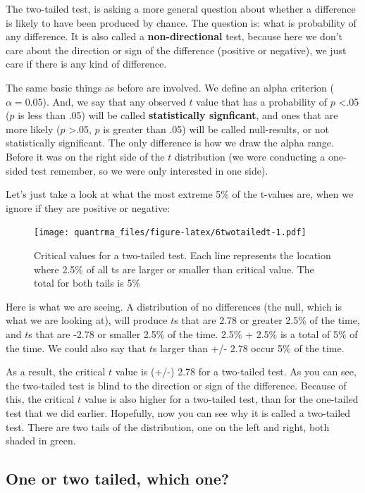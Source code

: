 \documentclass[
]{book}
\begin{document}
The two-tailed test, is asking a more general question about whether a difference is likely to have been produced by chance. The question is: what is probability of any difference. It is also called a \textbf{non-directional} test, because here we don't care about the direction or sign of the difference (positive or negative), we just care if there is any kind of difference.

The same basic things as before are involved. We define an alpha criterion (\(\alpha = 0.05\)). And, we say that any observed \(t\) value that has a probability of \(p\) \textless.05 (\(p\) is less than .05) will be called \textbf{statistically signficant}, and ones that are more likely (\(p\) \textgreater.05, \(p\) is greater than .05) will be called null-results, or not statistically significant. The only difference is how we draw the alpha range. Before it was on the right side of the \(t\) distribution (we were conducting a one-sided test remember, so we were only interested in one side).

Let's just take a look at what the most extreme 5\% of the t-values are, when we ignore if they are positive or negative:

\begin{figure}
\centering
\texttt{[image: quantrma\_files/figure-latex/6twotailedt-1.pdf]}
\caption{\label{fig:6twotailedt}Critical values for a two-tailed test. Each line represents the location where 2.5\% of all ts are larger or smaller than critical value. The total for both tails is 5\%}
\end{figure}

Here is what we are seeing. A distribution of no differences (the null, which is what we are looking at), will produce \(t\)s that are 2.78 or greater 2.5\% of the time, and \(t\)s that are -2.78 or smaller 2.5\% of the time. 2.5\% + 2.5\% is a total of 5\% of the time. We could also say that \(t\)s larger than +/- 2.78 occur 5\% of the time.

As a result, the critical \(t\) value is (+/-) 2.78 for a two-tailed test. As you can see, the two-tailed test is blind to the direction or sign of the difference. Because of this, the critical \(t\) value is also higher for a two-tailed test, than for the one-tailed test that we did earlier. Hopefully, now you can see why it is called a two-tailed test. There are two tails of the distribution, one on the left and right, both shaded in green.

\hypertarget{one-or-two-tailed-which-one}{%
\subsection{One or two tailed, which one?}\label{one-or-two-tailed-which-one}}
\end{document}
